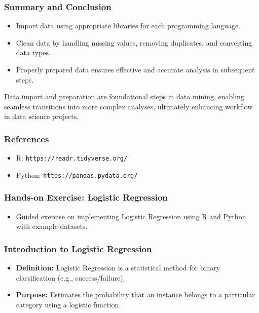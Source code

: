 \documentclass[aspectratio=169]{beamer}
\begin{document}
\begin{frame}
    \frametitle{Summary and Conclusion}
    \begin{itemize}
        \item Import data using appropriate libraries for each programming language.
        \item Clean data by handling missing values, removing duplicates, and converting data types.
        \item Properly prepared data ensures effective and accurate analysis in subsequent steps.
    \end{itemize}

    Data import and preparation are foundational steps in data mining, enabling seamless transitions into more complex analyses, ultimately enhancing workflow in data science projects.
\end{frame}

\begin{frame}
    \frametitle{References}
    \begin{itemize}
        \item R: \texttt{https://readr.tidyverse.org/}
        \item Python: \texttt{https://pandas.pydata.org/}
    \end{itemize}
\end{frame}

\begin{frame}[fragile]
    \frametitle{Hands-on Exercise: Logistic Regression}
    \begin{itemize}
        \item Guided exercise on implementing Logistic Regression using R and Python with example datasets.
    \end{itemize}
\end{frame}

\begin{frame}[fragile]
    \frametitle{Introduction to Logistic Regression}
    \begin{itemize}
        \item \textbf{Definition:} Logistic Regression is a statistical method for binary classification (e.g., success/failure).
        \item \textbf{Purpose:} Estimates the probability that an instance belongs to a particular category using a logistic function.
    \end{itemize}
\end{frame}
\end{document}
